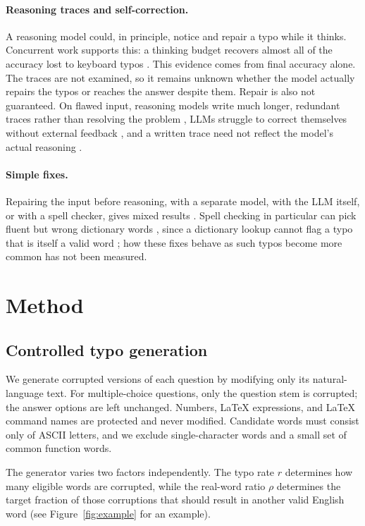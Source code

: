 \documentclass[11pt]{article}
\begin{document}
\paragraph{Reasoning traces and self-correction.} A reasoning model could, in principle, notice and repair a typo while it thinks. Concurrent work supports this: a thinking budget recovers almost all of the accuracy lost to keyboard typos \citep{hu2026}. This evidence comes from final accuracy alone. The traces are not examined, so it remains unknown whether the model actually repairs the typos or reaches the answer despite them. Repair is also not guaranteed. On flawed input, reasoning models write much longer, redundant traces rather than resolving the problem \citep{fan2025}, LLMs struggle to correct themselves without external feedback \citep{huang2024}, and a written trace need not reflect the model's actual reasoning \citep{turpin2023}.

\paragraph{Simple fixes.} Repairing the input before reasoning, with a separate model, with the LLM itself, or with a spell checker, gives mixed results \citep{pruthi2019,wang2024,mu2026,zhu2026}. Spell checking in particular can pick fluent but wrong dictionary words \citep{zhu2026}, since a dictionary lookup cannot flag a typo that is itself a valid word \citep{kukich1992}; how these fixes behave as such typos become more common has not been measured.


\section{Method}


\subsection{Controlled typo generation}

We generate corrupted versions of each question by modifying only its natural-language text. For multiple-choice questions, only the question stem is corrupted; the answer options are left unchanged. Numbers, LaTeX expressions, and LaTeX command names are protected and never modified. Candidate words must consist only of ASCII letters, and we exclude single-character words and a small set of common function words.

The generator varies two factors independently. The typo rate $r$ determines how many eligible words are corrupted, while the real-word ratio $\rho$ determines the target fraction of those corruptions that should result in another valid English word (see Figure~\ref{fig:example} for an example).
\end{document}
